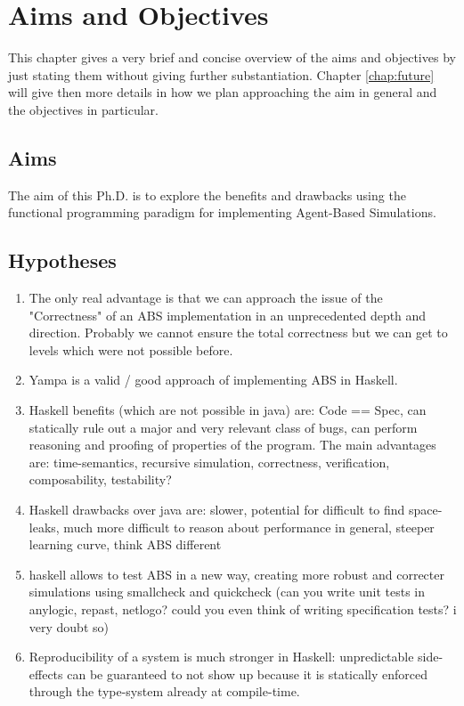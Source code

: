 \chapter{Aims and Objectives}
\label{chap:aimsObj}

This chapter gives a very brief and concise overview of the aims and objectives by just stating them without giving further substantiation. Chapter \ref{chap:future} will give then more details in how we plan approaching the aim in general and the objectives in particular.

\section{Aims}
The aim of this Ph.D. is to explore the benefits and drawbacks using the functional programming paradigm for implementing Agent-Based Simulations. 

\section{Hypotheses}
\begin{enumerate}
	\item The only real advantage is that we can approach the issue of the "Correctness" of an ABS implementation in an unprecedented depth and direction. Probably we cannot ensure the total correctness but we can get to levels which were not possible before.
	
	\item Yampa is a valid / good approach of implementing ABS in Haskell.
	
	\item Haskell benefits (which are not possible in java) are: Code == Spec, can statically rule out a major and very relevant class of bugs, can perform reasoning and proofing of properties of the program. The main advantages are: time-semantics, recursive simulation, correctness, verification, composability, testability?

	\item Haskell drawbacks over java are: slower, potential for difficult to find space-leaks, much more difficult to reason about performance in general, steeper learning curve, think ABS different 
	
	\item haskell allows to test ABS in a new way, creating more robust and correcter simulations using smallcheck and quickcheck (can you write unit tests in anylogic, repast, netlogo? could you even think of writing specification tests? i very doubt so)
	
	\item Reproducibility of a system is much stronger in Haskell: unpredictable side-effects can be guaranteed to not show up because it is statically enforced through the type-system already at compile-time.
\end{enumerate}

